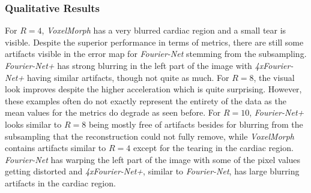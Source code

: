 \subsubsection{Qualitative Results}
For $R=4$, \emph{VoxelMorph} has a very blurred cardiac region and a small tear is visible. Despite the superior performance in terms of metrics, there are still some artifacts visible in the error map for \emph{Fourier-Net} stemming from the subsampling. \emph{Fourier-Net+} has strong blurring in the left part of the image with \emph{4xFourier-Net+} having similar artifacts, though not quite as much. For $R=8$, the visual look improves despite the higher acceleration which is quite surprising. However, these examples often do not exactly represent the entirety of the data as the mean values for the metrics do degrade as seen before. For $R=10$, \emph{Fourier-Net+} looks similar to $R=8$ being mostly free of artifacts besides for blurring from the subsampling that the reconstruction could not fully remove, while \emph{VoxelMorph} contains artifacts similar to $R=4$ except for the tearing in the cardiac region. \emph{Fourier-Net} has warping the left part of the image with some of the pixel values getting distorted and \emph{4xFourier-Net+}, similar to \emph{Fourier-Net}, has large blurring artifacts in the cardiac region.

